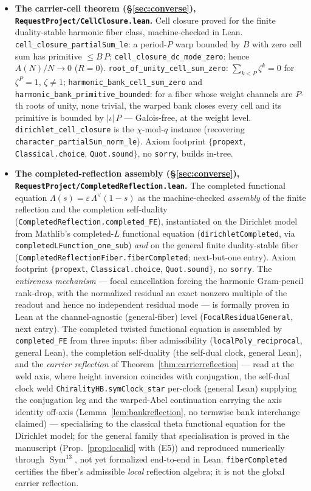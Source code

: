 \documentclass[11pt]{article}
\theoremstyle{definition}
\newcommand{\Sym}{\operatorname{Sym}}
\begin{document}
\begin{itemize}
\item \textbf{The carrier-cell theorem (\S\ref{sec:converse}), \texttt{RequestProject/CellClosure.lean}.}
Cell closure proved for the finite duality-stable harmonic fiber class, machine-checked in Lean.
\texttt{cell\_closure\_partialSum\_le}: a period-$P$ warp bounded by $B$ with zero cell sum has primitive
$\le B\,P$; \texttt{cell\_closure\_dc\_mode\_zero}: hence $A(N)/N\to0$ ($R=0$). \texttt{root\_of\_unity\_cell\_sum\_zero}:
$\sum_{k<P}\zeta^k=0$ for $\zeta^P=1$, $\zeta\ne1$; \texttt{harmonic\_bank\_cell\_sum\_zero} and
\texttt{harmonic\_bank\_primitive\_bounded}: for a fiber whose weight channels are $P$-th roots of unity,
none trivial, the warped bank closes every cell and its primitive is bounded by $|\iota|\,P$ --- Galois-free,
at the weight level. \texttt{dirichlet\_cell\_closure} is the $\chi$-mod-$q$ instance (recovering
\texttt{character\_partialSum\_norm\_le}). Axiom footprint $\{$\texttt{propext}, \texttt{Classical.choice},
\texttt{Quot.sound}$\}$, no \texttt{sorry}, builds in-tree.

\item \textbf{The completed-reflection assembly (\S\ref{sec:converse}),
\texttt{RequestProject/CompletedReflection.lean}.} The completed functional equation
$\Lambda(s)=\varepsilon\,\Lambda^\vee(1-s)$ as the machine-checked \emph{assembly} of the finite reflection
and the completion self-duality (\texttt{CompletedReflection.completed\_FE}), instantiated on
the Dirichlet model from Mathlib's completed-$L$ functional equation (\texttt{dirichletCompleted}, via
\texttt{completedLFunction\_one\_sub}) \emph{and} on the general finite duality-stable fiber
(\texttt{CompletedReflectionFiber.fiberCompleted}; next-but-one entry). Axiom footprint
$\{$\texttt{propext}, \texttt{Classical.choice}, \texttt{Quot.sound}$\}$, no \texttt{sorry}. The
\emph{entireness mechanism} --- focal cancellation forcing the harmonic Gram-pencil rank-drop, with the
normalized residual an exact nonzero multiple of the readout and hence no independent residual mode --- is
formally proven in Lean at the channel-agnostic (general-fiber) level (\texttt{FocalResidualGeneral}, next
entry). The completed twisted functional equation is assembled by \texttt{completed\_FE} from three inputs:
fiber admissibility (\texttt{localPoly\_reciprocal}, general Lean), the completion self-duality (the self-dual
clock, general Lean), and the \emph{carrier reflection} of Theorem~\ref{thm:carrierreflection} --- read at the
weld axis, where height inversion coincides with conjugation, the self-dual clock weld
\texttt{ChiralityHB.symClock\_star} per-clock (general Lean) supplying the conjugation leg and the warped-Abel
continuation carrying the axis identity off-axis (Lemma~\ref{lem:bankreflection}, no termwise bank interchange
claimed) --- specialising to the classical theta functional equation for
the Dirichlet model; for the general family that specialisation is proved in the manuscript
(Prop.~\ref{prop:localid} with \textup{(E5)}) and reproduced numerically through $\Sym^{13}$, not yet formalized
end-to-end in Lean. \texttt{fiberCompleted}
certifies the fiber's admissible \emph{local} reflection algebra; it is not the global carrier reflection.


\end{itemize}
\end{document}
